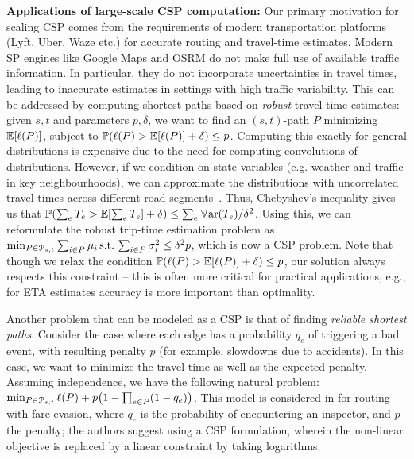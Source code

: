 \smallskip
\noindent\textbf{Applications of large-scale CSP computation:}
Our primary motivation for scaling CSP comes from the requirements of modern transportation platforms (Lyft, Uber, Waze etc.) for accurate routing and travel-time estimates.
Modern SP engines like Google Maps and OSRM do not make full use of available traffic information.
In particular, they do not incorporate uncertainties in travel times, leading to inaccurate estimates in settings with high traffic variability.
This can be addressed by computing shortest paths based on \emph{robust} travel-time estimates:
given $s,t$ and parameters $p,\delta$, we want to find an $(s,t)$-path $P$ minimizing $\mathbb{E}[\ell(P)]$, subject to $\mathbb{P}(\ell(P)>\mathbb{E}[\ell(P)]+\delta)\leq p$.
Computing this exactly for general distributions is expensive due to the need for computing convolutions of distributions. 
However, if we condition on state variables (e.g. weather and traffic in key neighbourhoods),  we can approximate the distributions with uncorrelated travel-times across different road segments~\cite{woodard2017predicting}. 
Thus, Chebyshev's inequality gives us that $\mathbb{P}(\sum_eT_e>\mathbb{E}[\sum_eT_e]+\delta)\leq \sum_e\mathbb{V}\textnormal{ar}(T_e)/\delta^2$. Using this, we can reformulate the robust trip-time estimation problem as 
$\min_{ P\in\mathcal{P}_{s,t}}\sum_{i\in P}\mu_i \, \mbox{s.t.}\, \sum_{i\in P}\sigma^2_i\leq \delta^2p$, which is now a CSP problem. 
Note that though we relax the condition $\mathbb{P}(\ell(P)>\mathbb{E}[\ell(P)]+\delta)\leq p$, our solution always respects this constraint -- this is often more critical for practical applications, e.g., for ETA estimates accuracy is more important than optimality.

Another problem that can be modeled as a CSP is that of finding \emph{reliable shortest paths}.
Consider the case where each edge has a probability $q_e$ of triggering a bad event, with resulting penalty $p$ (for example, slowdowns due to accidents).
In this case, we want to minimize the travel time as well as the expected penalty.
Assuming independence, we have the following natural problem:
$\min_{P\in\Pst} \ell(P)+p\prn*{1-\prod_{e\in P}(1-q_e)}$.
This model is considered in \cite{fareevasion} for routing with fare evasion, where $q_e$ is the probability of encountering an inspector, and $p$ the penalty; the authors suggest using a CSP formulation, wherein the non-linear objective is replaced by a linear constraint by taking logarithms.

